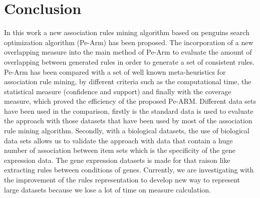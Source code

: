 \documentclass[preprint,12pt]{elsarticle}
\begin{document}
 \section{Conclusion}
In this work a new association rules mining algorithm based on penguins search optimization 
algorithm (Pe-Arm) has been proposed. The incorporation of a new overlapping measure  into the main method of Pe-Arm to evaluate the amount of overlapping between generated rules in order to generate a set of consistent rules. 
Pe-Arm has been compared with a set of well known meta-heuristics for association rule mining, by different criteria such as the computational time, the statistical measure (confidence and support) and finally with the coverage measure, which proved the efficiency of the proposed Pe-ARM. Different data sets have been used in the comparison, firstly is the standard data is used to evaluate the approach with those datasets that have been used by most of the association rule mining algorithm. Secondly, with a biological datasets, the use of biological data sets allows us to validate the approach with data that contain a huge number of association between item sets which is the specificity of the gene expression data. The gene expression datasets is made for that raison like extracting rules between conditions of genes. Currently, we are investigating with the improvement of the rules representation to develop new way to represent large datasets because we lose a lot of time on measure calculation.
\end{document}
